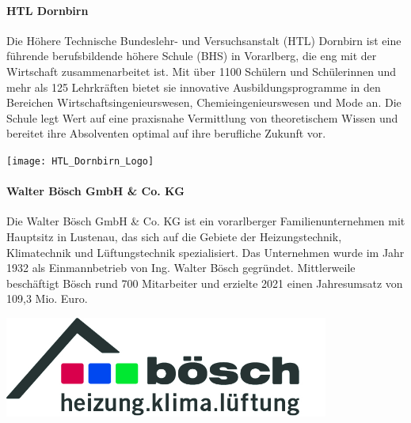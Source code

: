 \paragraph{HTL Dornbirn}
\vspace{1ex}
\begin{minipage}{0.6\textwidth}
    Die Höhere Technische Bundeslehr- und Versuchsanstalt (HTL) Dornbirn ist eine führende berufsbildende höhere Schule (BHS) in Vorarlberg, die eng mit der Wirtschaft zusammenarbeitet ist. Mit über 1100 Schülern und Schülerinnen und mehr als 125 Lehrkräften bietet sie innovative Ausbildungsprogramme in den Bereichen Wirtschaftsingenieurswesen, Chemieingenieurswesen und Mode an. Die Schule legt Wert auf eine praxisnahe Vermittlung von theoretischem Wissen und bereitet ihre Absolventen optimal auf ihre berufliche Zukunft vor.
\end{minipage}%
\hfill
\begin{minipage}{0.37\textwidth}
	\centering	
	\texttt{[image: HTL\_Dornbirn\_Logo]}
\end{minipage}
\vspace{1ex}

\paragraph{Walter Bösch GmbH \& Co. KG}
\vspace{1ex}
\begin{minipage}{0.6\textwidth}
Die Walter Bösch GmbH \& Co. KG ist ein vorarlberger Familienunternehmen mit Hauptsitz in Lustenau, das sich auf die Gebiete der Heizungstechnik, Klimatechnik und Lüftungstechnik spezialisiert. Das Unternehmen wurde im Jahr 1932 als Einmannbetrieb von Ing. Walter Bösch gegründet. Mittlerweile beschäftigt Bösch rund 700 Mitarbeiter und erzielte 2021 einen Jahresumsatz von 109,3 Mio. Euro. \cite[vgl.][]{walter_boesch:o.J.}
\end{minipage}%
\hfill
\begin{minipage}{0.37\textwidth}
	\centering	
	\includegraphics[width=0.8\textwidth]{boesch_logo_original}
\end{minipage}


